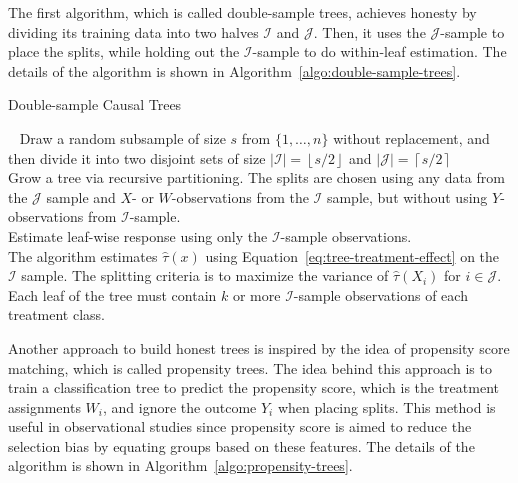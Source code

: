 \documentclass{article}
\begin{document}
The first algorithm, which is called double-sample trees, achieves
honesty by dividing its training data into two halves
$\mathcal{I}$ and $\mathcal{J}$. Then, it uses the
$\mathcal{J}$-sample to place the splits, while holding out the
$\mathcal{I}$-sample to do within-leaf estimation. The details of the
algorithm is shown in Algorithm~\ref{algo:double-sample-trees}.

\LinesNumberedHidden
\begin{algorithm}[h]

  \caption{Double-sample Causal Trees}~\label{algo:double-sample-trees}
  \ShowLn Draw a random subsample of size $s$ from $\{1, \ldots, n\}$ without
  replacement, and then divide it into two disjoint sets of size
  $|\mathcal{I}|=\left \lfloor s/2 \right \rfloor$ and
  $|\mathcal{J}|=\left \lceil s/2 \right \rceil$ \\
  \ShowLn Grow a tree via recursive partitioning. The splits are chosen using
  any data from the $\mathcal{J}$ sample and $X$- or $W$-observations
  from the $\mathcal{I}$ sample, but without using $Y$-observations
  from $\mathcal{I}$-sample. \\
  \ShowLn Estimate leaf-wise response using only the $\mathcal{I}$-sample
  observations. \\ [1\baselineskip]

The algorithm estimates $\hat{\tau}(x)$ using
Equation~\ref{eq:tree-treatment-effect} on the $\mathcal{I}$
sample. The splitting criteria is to maximize the variance of
$\hat{\tau}(X_i)$ for $i \in \mathcal{J}$. Each leaf of the tree must
contain $k$ or more $\mathcal{I}$-sample observations of each
treatment class.
\end{algorithm}
Another approach to build honest trees is inspired by the idea of
propensity score matching, which is called propensity trees. The idea
behind this approach is to train a classification tree to predict the
propensity score, which is the treatment assignments $W_i$, and ignore the outcome $Y_i$ when
placing splits. This method is useful in observational studies
since propensity score is aimed to reduce the selection bias by
equating groups based on these features. The details of the
algorithm is shown in Algorithm~\ref{algo:propensity-trees}.
\end{document}
